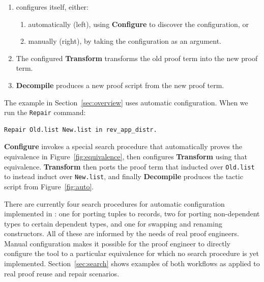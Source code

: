 \begin{enumerate}
\item \toolname configures itself, either:
\begin{enumerate}
\item automatically (left), using \textbf{Configure} to discover the configuration, or
\item manually (right), by taking the configuration as an argument.
\end{enumerate}
\item The configured \textbf{Transform} transforms the old proof term into the new proof term.
\item \textbf{Decompile} produces a new proof script from the new proof term.
\end{enumerate}

The example in Section~\ref{sec:overview} uses automatic configuration. When we run the \lstinline{Repair} command:

\begin{lstlisting}
Repair Old.list New.list in rev_app_distr.
\end{lstlisting}
\textbf{Configure} invokes a special search procedure that automatically proves the equivalence in Figure~\ref{fig:equivalence},
then configures \textbf{Transform} using that equivalence.
\textbf{Transform} then ports the proof term that inducted over \lstinline{Old.list}
to instead induct over \lstinline{New.list}, and finally
\textbf{Decompile} produces the tactic script from Figure~\ref{fig:auto}.

There are currently four search procedures for automatic configuration implemented in \toolname:
one for porting tuples to records, two for porting non-dependent types to certain dependent types, 
and one for swapping and renaming constructors.
All of these are informed by the needs of real proof engineers.
Manual configuration makes it possible for the proof engineer to directly configure the tool to a particular equivalence
for which no search procedure is yet implemented.
Section~\ref{sec:search} shows examples of both workflows as applied to real proof reuse and repair scenarios.




